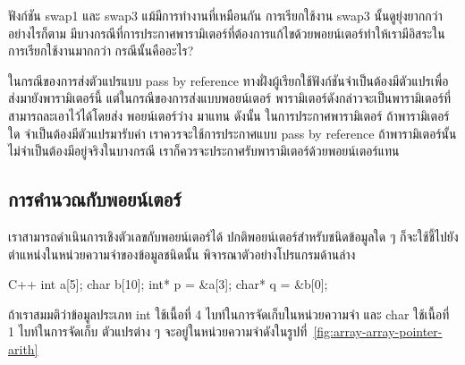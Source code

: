 \begin{quiz}{}
ฟังก์ชัน {\ct swap1} และ {\ct swap3} แม้{\wbr}มี{\wbr}การ{\wbr}ทำงาน{\wbr}ที่{\wbr}เหมือน{\wbr}กัน การ{\wbr}เรียก{\wbr}ใช้{\wbr}งาน{\wbr}
{\ct swap3} นั้น{\wbr}ดู{\wbr}ยุ่งยาก{\wbr}กว่า อย่างไรก็ตาม{\wbr}
มี{\wbr}บาง{\wbr}กรณี{\wbr}ที่{\wbr}การ{\wbr}ประกาศ{\wbr}พารามิเตอร์{\wbr}ที่{\wbr}ต้องการ{\wbr}แก้ไข{\wbr}ด้วย{\wbr}พอยน์เตอร์{\wbr}ทำ{\wbr}ให้{\wbr}เรา{\wbr}มี{\wbr}อิสระ{\wbr}ใน{\wbr}การ{\wbr}เรียก{\wbr}ใช้{\wbr}งาน{\wbr}มาก{\wbr}กว่า กรณี{\wbr}นั้น{\wbr}คือ{\wbr}อะไร?
\end{quiz}
\begin{quizans}
ใน{\wbr}กรณี{\wbr}ของ{\wbr}การ{\wbr}ส่ง{\wbr}ตัวแปร{\wbr}แบบ pass by reference
ทาง{\wbr}ฝั่ง{\wbr}ผู้{\wbr}เรียก{\wbr}ใช้{\wbr}ฟังก์ชัน{\wbr}จำเป็น{\wbr}ต้อง{\wbr}มี{\wbr}ตัวแปร{\wbr}เพื่อ{\wbr}ส่ง{\wbr}มา{\wbr}ยัง{\wbr}พารามิเตอร์{\wbr}นี้{\wbr}
แต่{\wbr}ใน{\wbr}กรณี{\wbr}ของ{\wbr}การ{\wbr}ส่ง{\wbr}แบบ{\wbr}พอยน์เตอร์
พารามิเตอร์{\wbr}ดังกล่าว{\wbr}จะ{\wbr}เป็น{\wbr}พารามิเตอร์{\wbr}ที่{\wbr}สามารถ{\wbr}ละ{\wbr}เอา{\wbr}ไว้{\wbr}ได้{\wbr}โดย{\wbr}ส่ง พอยน์เตอร์ว่าง {}
มา{\wbr}แทน ดังนั้น ใน{\wbr}การ{\wbr}ประกาศ{\wbr}พารามิเตอร์ ถ้า{\wbr}พารามิเตอร์{\wbr}ใด จำเป็น{\wbr}ต้อง{\wbr}มี{\wbr}ตัวแปร{\wbr}มา{\wbr}รับ{\wbr}ค่า{\wbr}
เรา{\wbr}ควร{\wbr}จะ{\wbr}ใช้{\wbr}การ{\wbr}ประกาศ{\wbr}แบบ pass by reference
ถ้า{\wbr}พารามิเตอร์{\wbr}นั้น{\wbr}ไม่{\wbr}จำเป็น{\wbr}ต้อง{\wbr}มี{\wbr}อยู่จริง{\wbr}ใน{\wbr}บาง{\wbr}กรณี{\wbr}
เรา{\wbr}ก็{\wbr}ควร{\wbr}จะ{\wbr}ประกาศ{\wbr}รับ{\wbr}พารามิเตอร์{\wbr}ด้วย{\wbr}พอยน์เตอร์{\wbr}แทน{\wbr}
\end{quizans}

\subsection{การ{\wbr}คำนวณ{\wbr}กับ{\wbr}พอยน์เตอร์}

เรา{\wbr}สามารถ{\wbr}ดำเนินการ{\wbr}เชิง{\wbr}ตัวเลข{\wbr}กับ{\wbr}พอยน์เตอร์{\wbr}ได้ ปกติ{\wbr}พอยน์เตอร์{\wbr}สำหรับ{\wbr}ชนิด{\wbr}ข้อมูล{\wbr}ใด ๆ
ก็{\wbr}จะ{\wbr}ใช้{\wbr}ชี้{\wbr}ไป{\wbr}ยัง{\wbr}ตำแหน่ง{\wbr}ใน{\wbr}หน่วยความจำ{\wbr}ของ{\wbr}ข้อมูล{\wbr}ชนิด{\wbr}นั้น พิจารณา{\wbr}ตัวอย่าง{\wbr}โปรแกรม{\wbr}ด้าน{\wbr}ล่าง{\wbr}

\latintext
\begin{codelist}{C++}{}
int a[5];
char b[10];
int* p = &a[3];
char* q = &b[0];
\end{codelist}
\thaitext

ถ้า{\wbr}เรา{\wbr}สมมติ{\wbr}ว่า{\wbr}ข้อมูล{\wbr}ประเภท {\ct int} ใช้เนื้อ{\wbr}ที่ 4 ไบท์ใน{\wbr}การ{\wbr}จัด{\wbr}เก็บ{\wbr}ใน{\wbr}หน่วยความจำ และ{\wbr}
{\ct char} ใช้เนื้อ{\wbr}ที่ 1 ไบท์ใน{\wbr}การ{\wbr}จัด{\wbr}เก็บ ตัวแปร{\wbr}ต่าง ๆ
จะ{\wbr}อยู่{\wbr}ใน{\wbr}หน่วยความจำ{\wbr}ดัง{\wbr}ใน{\wbr}รูป{\wbr}ที่~\ref{fig:array-array-pointer-arith}

